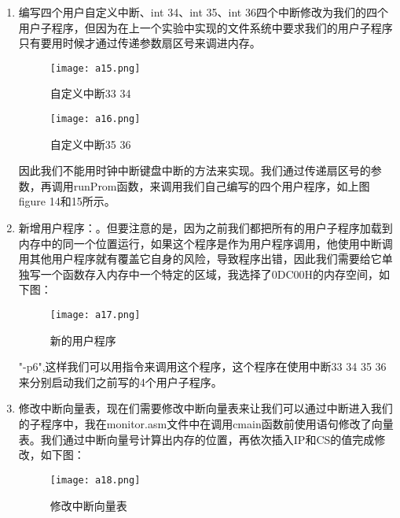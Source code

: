 \documentclass[UTF8]{article}
\begin{document}
\begin{enumerate}[1)]
	\item 编写四个用户自定义中断、int 34、int 35、int 36四个中断修改为我们的四个用户子程序，但因为在上一个实验中实现的文件系统中要求我们的用户子程序只有要用时候才通过传递参数扇区号来调进内存。
	\begin{figure}[htbp]
			\begin{minipage}[h]{0.5\linewidth}
			\centering
			\texttt{[image: a15.png]}
			\caption{自定义中断33 34}
			\end{minipage}
			\begin{minipage}[h]{0.5\linewidth}
				\centering
			\texttt{[image: a16.png]}
			\caption{自定义中断35 36}
			\end{minipage}
		\end{figure}
	\par 因此我们不能用时钟中断键盘中断的方法来实现。我们通过传递扇区号的参数，再调用runProm函数，来调用我们自己编写的四个用户程序，如上图figure 14和15所示。
\newpage
\item 新增用户程序：。但要注意的是，因为之前我们都把所有的用户子程序加载到内存中的同一个位置运行，如果这个程序是作为用户程序调用，他使用中断调用其他用户程序就有覆盖它自身的风险，导致程序出错，因此我们需要给它单独写一个函数存入内存中一个特定的区域，我选择了0DC00H的内存空间，如下图：
	\begin{figure}[htbp]
			\centering
			\texttt{[image: a17.png]}
			\caption{新的用户程序}
		\end{figure}
\vspace{-0.6cm}
"-p6",这样我们可以用指令来调用这个程序，这个程序在使用中断33 34 35 36来分别启动我们之前写的4个用户子程序。
	\item 修改中断向量表，现在们需要修改中断向量表来让我们可以通过中断进入我们的子程序中，我在monitor.asm文件中在调用cmain函数前使用语句修改了向量表。我们通过中断向量号计算出内存的位置，再依次插入IP和CS的值完成修改，如下图：
	\begin{figure}[htbp]
			\centering
			\texttt{[image: a18.png]}
			\caption{修改中断向量表}
		\end{figure}
	\newpage
	

\end{enumerate}
\end{document}
